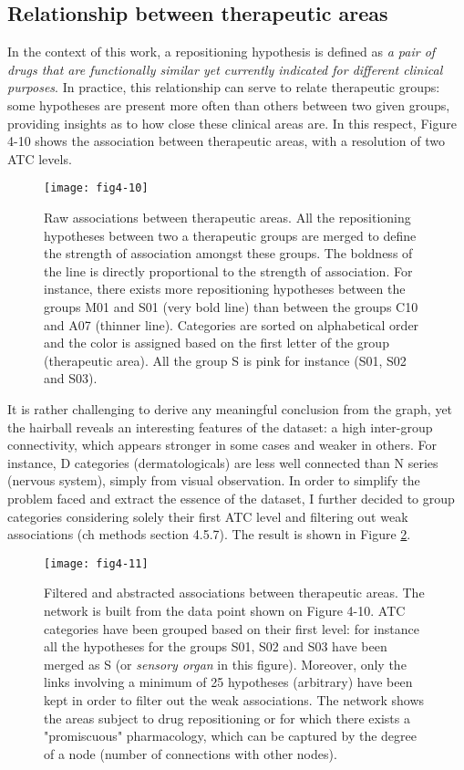 \subsection{Relationship between therapeutic areas}
In the context of this work, a repositioning hypothesis is defined as \emph{a pair of drugs that are functionally similar yet currently indicated for different clinical purposes}. In practice, this relationship can serve to relate therapeutic groups: some hypotheses are present more often than others between two given groups, providing insights as to how close these clinical areas are. In this respect, Figure 4-10 shows the association between therapeutic areas, with a resolution of two ATC levels.

\begin{figure}[H]
    \centering
    \texttt{[image: fig4-10]}
    \caption{Raw associations between therapeutic areas. All the repositioning hypotheses between two a therapeutic groups are merged to define the strength of association amongst these groups. The boldness of the line is directly proportional to the strength of association. For instance, there exists more repositioning hypotheses between the groups M01 and S01 (very bold line) than between the groups C10 and A07 (thinner line). Categories are sorted on alphabetical order and the color is assigned based on the first letter of the group (therapeutic area). All the group S is pink for instance (S01, S02 and S03).}
    \label{fig4-10}
\end{figure}

It is rather challenging to derive any meaningful conclusion from the graph, yet the hairball reveals an interesting features of the dataset: a high inter-group connectivity, which appears stronger in some cases and weaker in others. For instance, D categories (dermatologicals) are less well connected than N series (nervous system), simply from visual observation. In order to simplify the problem faced and extract the essence of the dataset, I further decided to group categories considering solely their first ATC level and filtering out weak associations (ch methods section 4.5.7). The result is shown in Figure \ref{fig4-11}.

\begin{figure}[H]
    \centering
    \texttt{[image: fig4-11]}
    \caption{Filtered and abstracted associations between therapeutic areas. The network is built from the data point shown on Figure 4-10. ATC categories have been grouped based on their first level: for instance all the hypotheses for the groups S01, S02 and S03 have been merged as S (or \emph{sensory organ} in this figure). Moreover, only the links involving a minimum of 25 hypotheses (arbitrary) have been kept in order to filter out the weak associations. The network shows the areas subject to drug repositioning or for which there exists a "promiscuous" pharmacology, which can be captured by the degree of a node (number of connections with other nodes).}
    \label{fig4-11}
\end{figure}

